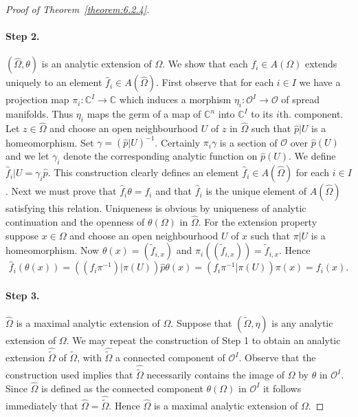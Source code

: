 \begin{proof}[Proof of Theorem~\ref{theorem:6.2.4}]
\paragraph{Step 2.} $(\widehat\Omega,\theta)$ is an analytic extension of $\Omega$. We show that each $f_i\in A(\Omega)$ extends uniquely to an element $\widehat f_i\in A(\widehat\Omega)$. First observe that for each $i\in I$ we have a projection map $\pi_i:\mathbb C^I\to\mathbb C$ which induces a morphism $\eta_i:\mathcal O^I\to\mathcal O$ of spread manifolds. Thus $\eta_i$ maps the germ of a map of $\mathbb C^n$ into $\mathbb C^I$ to its $i$th. component. Let $z\in\widehat\Omega$ and choose an open neighbourhood $U$ of $z$ in $\widehat\Omega$ such that $\widehat p|U$ is a homeomorphism. Set $\gamma=(\widehat p|U)^{-1}$. Certainly $\pi_i\gamma$ is a section of $\mathcal O$ over $\widehat p(U)$ and we let $\gamma_i$ denote the corresponding analytic function on $\widehat p(U)$. We define $\widehat f_i|U=\gamma_i\widehat p$. This construction clearly defines an element $\widehat f_i\in A(\widehat\Omega)$ for each $i\in I$. Next we must prove that $\widehat f_i\theta=f_i$ and that $\widehat f_i$ is the unique element of $A(\widehat\Omega)$ satisfying this relation. Uniqueness is obvious by uniqueness of analytic continuation and the openness of $\theta(\Omega)$ in $\widehat\Omega$. For the extension property suppose $x\in\Omega$ and choose an open neighbourhood $U$ of $x$ such that $\pi|U$ is a homeomorphism. Now $\theta(x)=(\widetilde f_{i,x})$ and $\pi_i((\widetilde f_{i,x}))=\widetilde f_{i,x}$. Hence
\[
\widehat f_i(\theta(x))=((f_i\pi^{-1})|\pi(U))\widehat p\theta(x)=(f_i\pi^{-1}|\pi(U))\pi(x)=f_i(x).
\]
\paragraph{Step 3.} $\widehat\Omega$ is a maximal analytic extension of $\Omega$. Suppose that $(\widetilde\Omega,\eta)$ is any analytic extension of $\Omega$. We may repeat the construction of Step 1 to obtain an analytic extension $\widehat{\widetilde\Omega}$ of $\widetilde\Omega$, with $\widehat{\widetilde\Omega}$ a connected component of $\mathcal O^I$. Observe that the construction used implies that $\widehat{\widetilde\Omega}$ necessarily contains the image of $\Omega$ by $\theta$ in $\mathcal O^I$. Since $\widehat\Omega$ is defined as the connected component $\theta(\Omega)$ in $\mathcal O^I$ it follows immediately that $\widehat\Omega=\widehat{\widetilde\Omega}$. Hence $\widehat\Omega$ is a maximal analytic extension of $\Omega$.


\end{proof}
